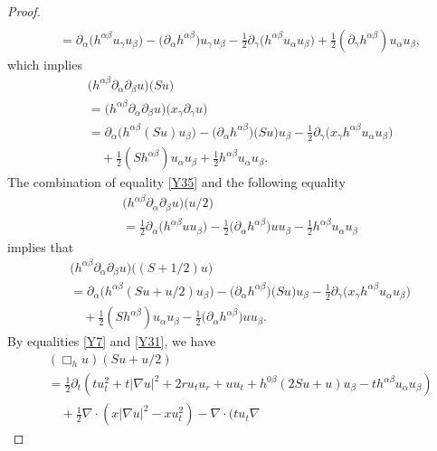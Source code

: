 \documentclass[10pt,a4paper]{amsart}
\begin{document}
\begin{proof}
\begin{align*}
\\&=\partial_{\alpha}\big(h^{\alpha\beta}u_{\gamma}u_{\beta}\big)
-\big(\partial_{\alpha}h^{\alpha\beta}\big)u_{\gamma}u_{\beta}
-\frac12\partial_{\gamma}\big(h^{\alpha\beta}u_{\alpha}u_{\beta}\big)
+\frac12(\partial_{\gamma}h^{\alpha\beta})u_{\alpha}u_{\beta},
\end{align*}
which implies
\begin{align}\label{Y35}
&\big(h^{\alpha\beta}\partial_{\alpha}\partial_{\beta}u\big)\big(Su\big)
\nonumber\\&=\big(h^{\alpha\beta}\partial_{\alpha}\partial_{\beta}u\big)\big(x_{\gamma}\partial_{\gamma}u\big)
\nonumber\\&=\partial_{\alpha}\big(h^{\alpha\beta}(Su)u_{\beta}\big)
-\big(\partial_{\alpha}h^{\alpha\beta}\big)\big(Su\big)u_{\beta}
-\frac12\partial_{\gamma}\big(x_{\gamma}h^{\alpha\beta}u_{\alpha}u_{\beta}\big)
\nonumber\\&\quad+\frac12(Sh^{\alpha\beta})u_{\alpha}u_{\beta}+\frac12h^{\alpha\beta}u_{\alpha}u_{\beta}.
\end{align}
The combination of equality \eqref{Y35} and the following equality
\begin{align*}
&\big(h^{\alpha\beta}\partial_{\alpha}\partial_{\beta}u\big)\big(u/2\big)
\\&=\frac12\partial_{\alpha}\big(h^{\alpha\beta}uu_{\beta}\big)
-\frac12\big(\partial_{\alpha}h^{\alpha\beta}\big)uu_{\beta}
-\frac12h^{\alpha\beta}u_{\alpha}u_{\beta}
\end{align*}
implies that
\begin{align}\label{Y31}
&\big(h^{\alpha\beta}\partial_{\alpha}\partial_{\beta}u\big)\big((S+1/2)u\big)
\nonumber\\&=\partial_{\alpha}\big(h^{\alpha\beta}(Su+u/2)u_{\beta}\big)
-\big(\partial_{\alpha}h^{\alpha\beta}\big)\big(Su\big)u_{\beta}
-\frac12\partial_{\gamma}\big(x_{\gamma}h^{\alpha\beta}u_{\alpha}u_{\beta}\big)
\nonumber\\&\quad+\frac12(Sh^{\alpha\beta})u_{\alpha}u_{\beta}-\frac12\big(\partial_{\alpha}h^{\alpha\beta}\big)uu_{\beta}.
\end{align}
By equalities \eqref{Y7} and \eqref{Y31}, we have
\begin{align}\label{Y37}
&(\Box_h
u)(Su+u/2)\nonumber\\&=\frac12\partial_t(tu_t^2+t|\nabla
u|^2+2ru_tu_r+uu_t+h^{0\beta}(2Su+u)u_{\beta}-th^{\alpha\beta}u_{\alpha}u_{\beta})\nonumber\\&\quad+\frac12\nabla\cdot(x|\nabla
u|^2-xu_t^2)-\nabla\cdot(tu_t\nabla

\end{align}
\end{proof}
\end{document}
